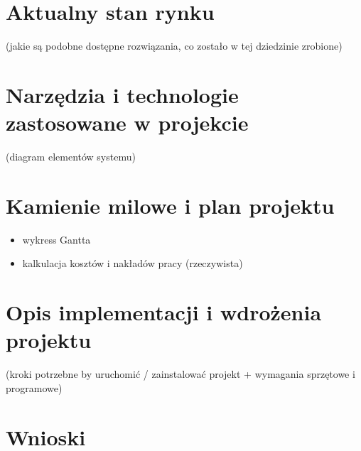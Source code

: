 \documentclass[12pt]{article}
\begin{document}
\newpage
\section{Aktualny stan rynku }
(jakie są podobne dostępne rozwiązania, co zostało w tej dziedzinie zrobione)
	




\newpage
\section{Narzędzia i technologie zastosowane w projekcie}
(diagram elementów systemu)


\newpage
\section{Kamienie milowe i plan projektu}
\begin{itemize}
\item wykress Gantta
\item kalkulacja kosztów i nakładów pracy (rzeczywista)
\end{itemize}


\newpage
\section{Opis implementacji i wdrożenia projektu}
(kroki potrzebne by uruchomić / zainstalować projekt + wymagania sprzętowe i programowe)


\newpage
\section{Wnioski}
\end{document}
